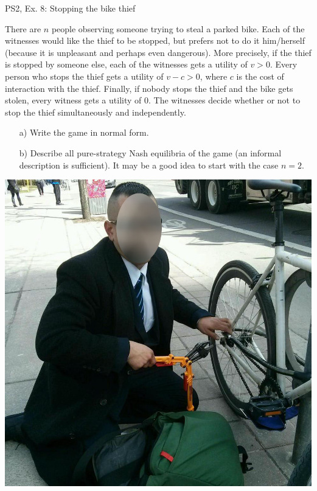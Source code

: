 \begin{frame}{PS2, Ex. 8: Stopping the bike thief}
  \begin{multicols}{2}
    There are $n$ people observing someone trying to steal a parked bike. Each of the witnesses would like the thief to be stopped, but prefers not to do it him/herself (because it is unpleasant and perhaps even dangerous). More precisely, if the thief is stopped by someone else, each of the witnesses gets a utility of $v > 0$. Every person who stops the thief gets a utility of $v-c>0$, where $c$ is the cost of interaction with the thief. Finally, if nobody stops the thief and the bike gets stolen, every witness gets a utility of $0$. The witnesses decide whether or not to stop the thief simultaneously and independently.
  \vfill\null \columnbreak
    \begin{itemize}
      \item[a)] Write the game in normal form.
      \item[b)] Describe all pure-strategy Nash equilibria of the game (an informal description is sufficient). It may be a good idea to start with the case $n = 2$.
    \end{itemize}
    \includegraphics[width=.5 \textwidth]{figures/bike_thief}
  \vfill\null
  \end{multicols}
\end{frame}
